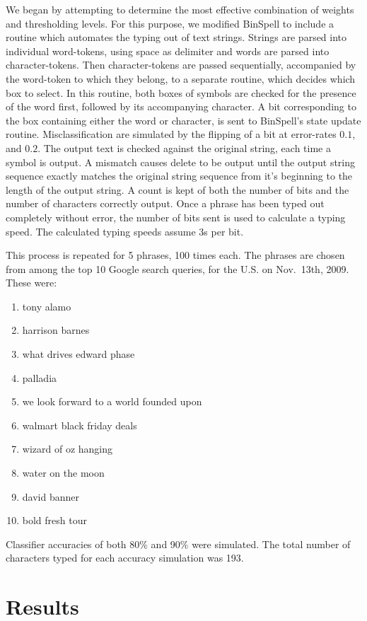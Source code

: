 \documentclass[12pt,titlepage]{article}
\begin{document}
We began by attempting to determine the most effective combination of weights and 
thresholding levels.  For this purpose, we modified BinSpell to include a routine which 
automates the typing out of text strings.  Strings are parsed  into individual word-tokens, using 
space as delimiter and words are parsed into character-tokens.  Then character-tokens are 
passed sequentially, accompanied by the word-token to which they belong, to a separate routine, which decides which box to select.  In this routine, both boxes of 
symbols are checked for the presence of the word first, followed by its accompanying 
character.  A bit corresponding to the box containing either the word or character, is sent to BinSpell's state update routine. 
Misclassification are simulated by the flipping of a bit at error-rates $0.1$, and $0.2$.  The output text is checked against the original string, each time a symbol is output.  A mismatch causes delete to be output until the output string sequence exactly matches the original string sequence from it's beginning to the length of the output string.  A count is 
kept of both the number of bits and the number of characters correctly output.  Once a phrase 
has been typed out completely without error, the number of bits sent is used to calculate a 
typing speed.  The calculated typing speeds assume 3s per bit.

This process is repeated for 5 phrases, 100 times each.  The phrases are chosen from  among 
the top 10 Google search queries, for the  U.S. on Nov.~13th, 2009.  These were: 
\begin{enumerate}
\item tony alamo 
\item harrison barnes 
\item what drives edward phase 
\item palladia 
\item we look forward to a world founded upon 
\item walmart black friday deals 
\item wizard of oz hanging 
\item water on the moon 
\item david banner 
\item bold fresh tour
\end{enumerate}

Classifier accuracies of both 80\% and 90\% were simulated.  The total number of characters 
typed for each accuracy simulation was 193.

\section{Results}
\end{document}
